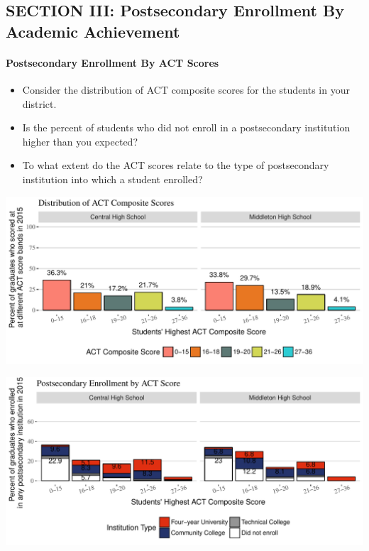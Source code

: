 \documentclass[11pt,]{article}
\providecommand{\tightlist}{%
  \setlength{\itemsep}{0pt}\setlength{\parskip}{0pt}}
\let\oldparagraph\paragraph
\renewcommand{\paragraph}[1]{\oldparagraph{#1}\mbox{}}
\begin{document}
\newpage

\subsection{SECTION III: Postsecondary Enrollment By Academic
Achievement}\label{section-iii-postsecondary-enrollment-by-academic-achievement}

\paragraph{Postsecondary Enrollment By ACT
Scores}\label{postsecondary-enrollment-by-act-scores}

\begin{itemize}
\tightlist
\item
  Consider the distribution of ACT composite scores for the students in
  your district.\\
   
\item
  Is the percent of students who did not enroll in a postsecondary
  institution higher than you expected?
\item
  To what extent do the ACT scores relate to the type of postsecondary
  institution into which a student enrolled?
\end{itemize}

\includegraphics{20170517_PSWRR_files/figure-latex/ACT_distribution-1.pdf}

\includegraphics{20170517_PSWRR_files/figure-latex/Figure7a-1.pdf}
\end{document}
